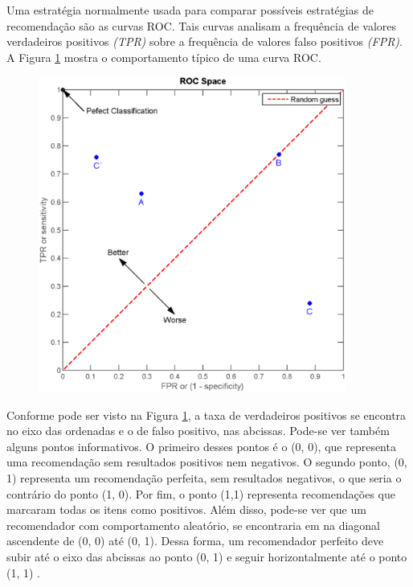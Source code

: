 Uma estratégia normalmente usada para comparar possíveis estratégias de
recomendação são as curvas ROC. Tais curvas analisam a frequência de valores
verdadeiros positivos \textit{(TPR)} sobre a frequência de valores falso
positivos \textit{(FPR)}. A Figura
\ref{fig:curva_roc} mostra o comportamento típico de uma curva ROC.

\begin{figure}[h]
  \centering
  \includegraphics[width=0.9\textwidth]{figuras/curva_roc.eps}
  \caption{}
  \label{fig:curva_roc}
\end{figure}

Conforme pode ser visto na Figura \ref{fig:curva_roc}, a taxa de verdadeiros
positivos se encontra no eixo das ordenadas e o de falso positivo, nas
abcissas. Pode-se ver também alguns pontos informativos. O primeiro desses
pontos é o (0, 0), que representa uma recomendação sem resultados positivos nem
negativos. O segundo ponto, (0, 1) representa um recomendação perfeita, sem
resultados negativos, o que seria o contrário do ponto (1, 0). Por fim, o ponto
(1,1) representa recomendações que marcaram todas os itens como positivos. Além
disso, pode-se ver que um recomendador com comportamento aleatório, se
encontraria em na diagonal ascendente de (0, 0) até (0, 1). Dessa forma, um
recomendador perfeito deve subir até o eixo das abcissas ao ponto (0, 1) e
seguir horizontalmente até o ponto (1, 1) \cite{araujo2011apprecommender}.

